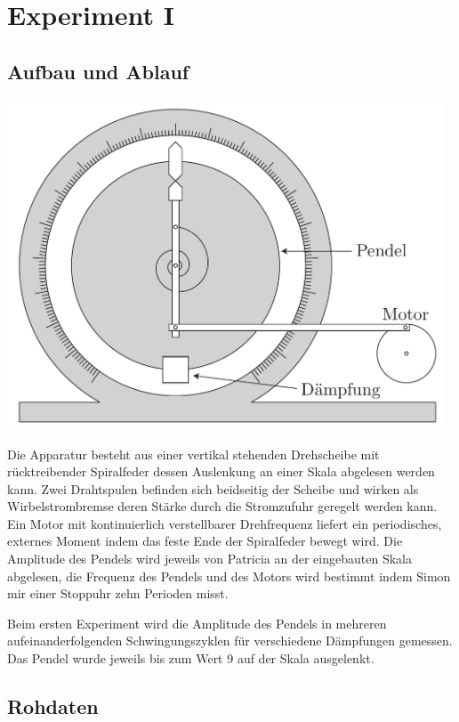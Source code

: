\documentclass[12pt,a4paper]{article}
\begin{document}
\section*{Experiment I}

\subsection*{Aufbau und Ablauf}
\begin{center}
\includegraphics[width=13cm]{illustration.pdf}
\end{center}
Die Apparatur besteht aus einer vertikal stehenden Drehscheibe mit r\"ucktreibender Spiralfeder dessen Auslenkung an einer Skala abgelesen werden kann. Zwei Drahtspulen befinden sich beidseitig der Scheibe und wirken als Wirbelstrombremse deren St\"arke durch die Stromzufuhr geregelt werden kann. Ein Motor mit kontinuierlich verstellbarer Drehfrequenz liefert ein periodisches, externes Moment indem das feste Ende der Spiralfeder bewegt wird. Die Amplitude des Pendels wird jeweils von Patricia an der eingebauten Skala abgelesen, die Frequenz des Pendels und des Motors wird bestimmt indem Simon mir einer Stoppuhr zehn Perioden misst.

Beim ersten Experiment wird die Amplitude des Pendels in mehreren aufeinanderfolgenden Schwingungszyklen f\"ur verschiedene Dämpfungen gemessen. Das Pendel wurde jeweils bis zum Wert 9 auf der Skala ausgelenkt.

\subsection*{Rohdaten}
\end{document}
